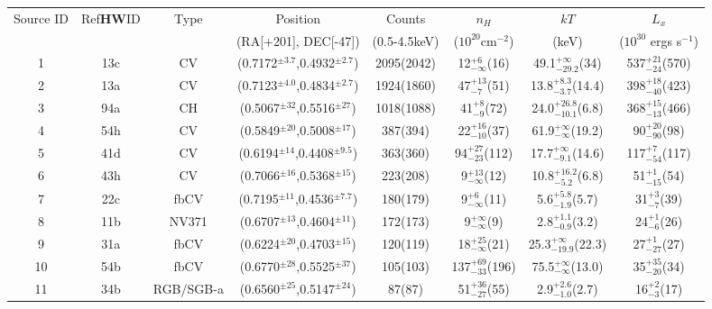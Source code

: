 \documentclass[aps,
                pra,  
                a4paper, 
                amsmath, 
                amssymb, 
                preprint,
                tightenlines,  
                amsfonts,
                nofootinbib,
                notitlepage
            ]{revtex4-2}
\begin{document}
\begin{center}
    \begin{table}
    \begin{tabular}{cccccccc}
        \hline
        Source ID & Ref{\bf HW}ID & Type & Position & Counts & $n_H$ & $kT$ & $L_x$\\
        & & & (RA[+201], DEC[-47]) & (0.5-4.5keV) & ($10^{20}$cm$^{-2}$) & (keV) & ($10^{30}$ ergs s$^{-1}$)\\
        \hline
        1 & 13c & CV & (0.7172$^{\pm3.7}$,0.4932$^{\pm2.7}$) & 2095(2042) & 12$^{+6}_{-\infty}$(16) & 49.1$^{+\infty}_{-29.2}$(34) & 537$^{+21}_{-24}$(570)\\
        2 & 13a & CV & (0.7123$^{\pm4.0}$,0.4834$^{\pm2.7}$) & 1924(1860) & 47$^{+13}_{-7}$(51) & 13.8$^{+8.3}_{-3.7}$(14.4) & 398$^{+18}_{-40}$(423)\\
        3 & 94a & CH & (0.5067$^{\pm32}$,0.5516$^{\pm27}$) & 1018(1088) & 41$^{+8}_{-9}$(72) & 24.0$^{+26.8}_{-10.1}$(6.8) & 368$^{+15}_{-13}$(466)\\
        4 & 54h & CV & (0.5849$^{\pm20}$,0.5008$^{\pm17}$) & 387(394) & 22$^{+16}_{-10}$(37) & 61.9$^{+\infty}_{-\infty}$(19.2) & 90$^{+20}_{-90}$(98)\\
        5 & 41d & CV & (0.6194$^{\pm14}$,0.4408$^{\pm9.5}$) & 363(360) & 94$^{+27}_{-23}$(112) & 17.7$^{+\infty}_{-9.1}$(14.6) & 117$^{+7}_{-54}$(117)\\
        6 & 43h & CV & (0.7066$^{\pm16}$,0.5368$^{\pm15}$) & 223(208) & 9$^{+13}_{-\infty}$(12) & 10.8$^{+16.2}_{-5.2}$(6.8) & 51$^{+1}_{-15}$(54)\\
        7 & 22c & fbCV & (0.7195$^{\pm11}$,0.4536$^{\pm7.7}$) & 180(179) & 9$^{+6}_{-\infty}$(11) & 5.6$^{+5.8}_{-1.9}$(5.7) & 31$^{+3}_{-7}$(39)\\
        8 & 11b & NV371 & (0.6707$^{\pm13}$,0.4604$^{\pm11}$) & 172(173) & 9$^{+\infty}_{-\infty}$(9) & 2.8$^{+1.1}_{-0.9}$(3.2) & 24$^{+1}_{-6}$(26)\\
        9 & 31a & fbCV & (0.6224$^{\pm20}$,0.4703$^{\pm15}$) & 120(119) & 18$^{+25}_{-\infty}$(21) & 25.3$^{+\infty}_{-19.9}$(22.3) & 27$^{+1}_{-27}$(27)\\
        10 & 54b & fbCV & (0.6770$^{\pm28}$,0.5525$^{\pm37}$) & 105(103) & 137$^{+69}_{-33}$(196) & 75.5$^{+\infty}_{-\infty}$(13.0) & 35$^{+35}_{-20}$(34)\\
        11 & 34b & RGB/SGB-a & (0.6560$^{\pm25}$,0.5147$^{\pm24}$) & 87(87) & 51$^{+36}_{-27}$(55) & 2.9$^{+2.6}_{-1.0}$(2.7) & 16$^{+2}_{-3}$(17)\\

\end{tabular}
\end{table}
\end{center}
\end{document}
